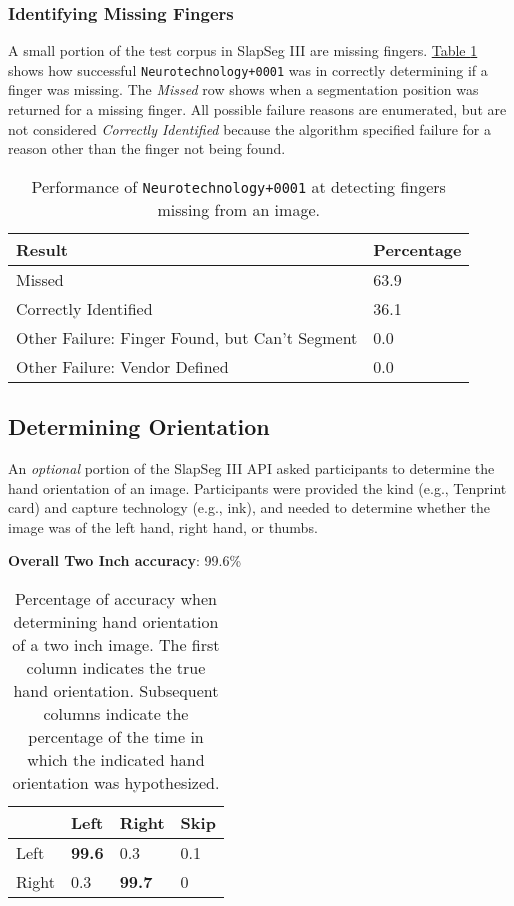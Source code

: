 \documentclass[]{article}
\begin{document}
\subsubsection{Identifying Missing
Fingers}\label{twoinch-troublesome-missing}

A small portion of the test corpus in SlapSeg III are missing fingers.
\protect\hyperlink{tab:twoinch-missing-finger}{Table
\ref{tab:twoinch-missing-finger}} shows how successful
\texttt{Neurotechnology+0001} was in correctly determining if a finger
was missing. The \emph{Missed} row shows when a segmentation position
was returned for a missing finger. All possible failure reasons are
enumerated, but are not considered \emph{Correctly Identified} because
the algorithm specified failure for a reason other than the finger not
being found.

\begin{table}[!h]

\caption{\label{tab:twoinch-missing-finger}Performance of \texttt{Neurotechnology+0001} at detecting fingers missing from an image.}
\centering
\begin{tabular}{ll}
\toprule
Result & Percentage\\
\midrule
\rowcolor{gray!6}  Missed & 63.9\\
Correctly Identified & 36.1\\
\addlinespace
\rowcolor{gray!6}  Other Failure: Finger Found, but Can't Segment & 0.0\\
Other Failure: Vendor Defined & 0.0\\
\bottomrule
\end{tabular}
\end{table}

\clearpage

\subsection{Determining Orientation}\label{sec-twoinch-orientation}

An \emph{optional} portion of the SlapSeg III API asked participants to
determine the hand orientation of an image. Participants were provided
the kind (e.g., Tenprint card) and capture technology (e.g., ink), and
needed to determine whether the image was of the left hand, right hand,
or thumbs.

\textbf{Overall Two Inch accuracy}: 99.6\%

\begin{table}[!h]

\caption{\label{tab:unnamed-chunk-17}Percentage of accuracy when determining hand orientation of a two inch image. The first column indicates the true hand orientation. Subsequent columns indicate the percentage of the time in which the indicated hand orientation was hypothesized.}
\centering
\begin{tabular}{llll}
\toprule
 & Left & Right & Skip\\
\midrule
\rowcolor{gray!6}  Left & \textbf{99.6} & 0.3 & 0.1\\
Right & 0.3 & \textbf{99.7} & 0\\
\bottomrule
\end{tabular}
\end{table}
\end{document}
